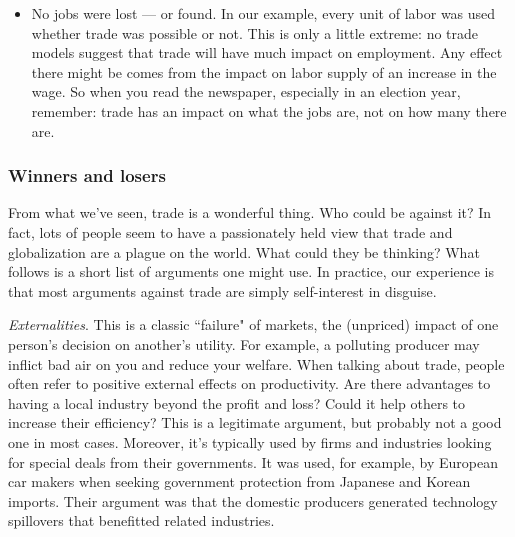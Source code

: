 \documentclass[letterpaper,12pt]{article}
\begin{document}
\begin{itemize}
\item No jobs were lost --- or found.
In our example, every unit of labor was used whether trade was possible or not.
This is only a little extreme:  no trade models suggest that trade will have much
impact on employment.  Any effect there might be comes from the
impact on labor supply of an increase in the wage.
So when you read the newspaper, especially in an election year,
remember: trade has an impact on what the jobs are, not on how
many there are.

\end{itemize}


\subsubsection*{Winners and losers}

From what we've seen, trade is a wonderful thing.  Who could
be against it?  In fact, lots of people seem to have a
passionately held view that trade and globalization are a
plague on the world.  What could they be thinking? What follows is
a short list of arguments one might use.
In practice, our experience is that most arguments against trade
are simply self-interest in disguise.


\textit{Externalities}.  This is a classic ``failure" of markets,
the (unpriced) impact of one person's decision on another's
utility. For example, a polluting producer may inflict bad air on
you and reduce your welfare. When talking about trade, people
often refer to positive external effects on productivity.  Are
there advantages to having a local industry beyond the profit and
loss? Could it help others to increase their efficiency? This is a
legitimate argument, but probably not a good one in most cases.
Moreover, it's typically used by firms and industries looking for
special deals from their governments. It was used, for example, by
European car makers when seeking government protection from
Japanese and Korean imports. Their argument was that the domestic
producers generated technology spillovers that benefitted
related industries.
\end{document}
